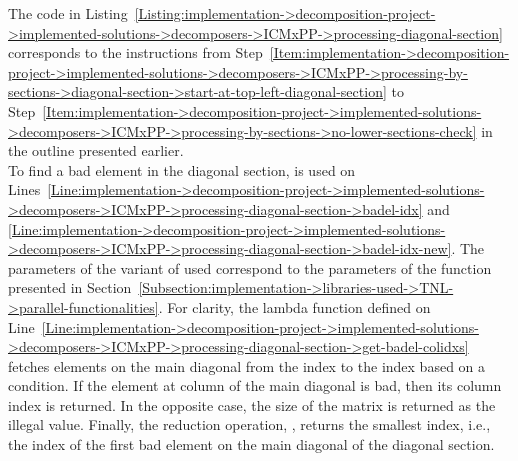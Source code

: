 The code in Listing~\ref{Listing:implementation->decomposition-project->implemented-solutions->decomposers->ICMxPP->processing-diagonal-section} corresponds to the instructions from Step~\ref{Item:implementation->decomposition-project->implemented-solutions->decomposers->ICMxPP->processing-by-sections->diagonal-section->start-at-top-left-diagonal-section} to Step~\ref{Item:implementation->decomposition-project->implemented-solutions->decomposers->ICMxPP->processing-by-sections->no-lower-sections-check} in the outline presented earlier.\\
To find a bad element in the diagonal section,  is used on Lines~\ref{Line:implementation->decomposition-project->implemented-solutions->decomposers->ICMxPP->processing-diagonal-section->badel-idx} and \ref{Line:implementation->decomposition-project->implemented-solutions->decomposers->ICMxPP->processing-diagonal-section->badel-idx-new}. The parameters of the variant of  used correspond to the parameters of the  function presented in Section~\ref{Subsection:implementation->libraries-used->TNL->parallel-functionalities}. For clarity, the lambda function defined on Line~\ref{Line:implementation->decomposition-project->implemented-solutions->decomposers->ICMxPP->processing-diagonal-section->get-badel-colidxs} fetches elements on the main diagonal from the  index to the  index based on a condition. If the element at column  of the main diagonal is bad, then its column index is returned. In the opposite case, the size of the matrix is returned as the illegal value. Finally, the reduction operation, , returns the smallest index, i.e., the index of the first bad element on the main diagonal of the diagonal section.

